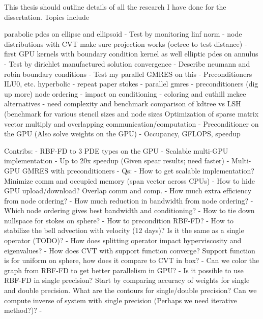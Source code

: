 This thesis should outline details of all the research I have done for the dissertation. Topics include 

parabolic pdes on ellipse and ellipsoid
    - Test by monitoring linf norm
    - node distributions with CVT make sure projection works (octree to test distance)
    - first GPU kernels with boundary condition kernel as well 
elliptic pdes on annulus
    - Test by dirichlet manufactured solution convergence
    - Describe neumann and robin boundary conditions
    - Test my parallel GMRES on this
    - Preconditioners ILU0, etc.
hyperbolic
    - repeat paper
stokes
    - parallel gmres
    - preconditioners (dig up more)
node ordering
    - impact on conditioning
    - coloring and cuthill mckee alternatives
    - need complexity and benchmark comparison of kdtree vs LSH (benchmark for
    various stencil sizes and node sizes
Optimization of sparse matrix vector multiply and overlapping communication/computation
    - Preconditioner on the GPU (Also solve weights on the GPU)
    - Occupancy, GFLOPS, speedup

Contribs: 
    - RBF-FD to 3 PDE types on the GPU
    - Scalable multi-GPU implementation
    - Up to 20x speedup (Given spear results; need faster)
    - Multi-GPU GMRES with preconditioners
    - Qs: 
        - How to get scalable implementation? Minimize comm and occupied memory
        (span vector across CPUs)
        - How to hide GPU upload/download? Overlap comm and comp.
        - How much extra efficiency from node ordering? 
        - How much reduction in bandwidth from node ordering?
        - Which node ordering gives best bandwidth and conditioning?
        - How to tie down nullspace for stokes on sphere?
        - How to precondition RBF-FD? 
        - How to stabilize the bell advection with velocity (12 days)? Is it
        the same as a single operator (TODO)? 
        - How does splitting operator impact hyperviscosity and eigenvalues? 
        - How does CVT with support function converge? Support function is for
        uniform on sphere, how does it compare to CVT in box?
        - Can we color the graph from RBF-FD to get better parallelism in GPU? 
        - Is it possible to use RBF-FD in single precision? Start by comparing
        accuracy of weights for single and double precision. What are the
        contours for single/double precision? Can we compute inverse of system
        with single precision (Perhaps we need iterative method?)?
        - 
